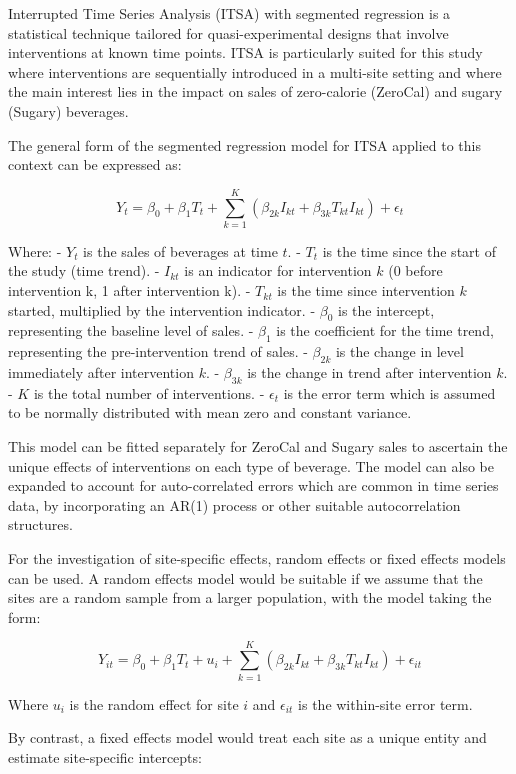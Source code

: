 \documentclass[
]{article}
\begin{document}
Interrupted Time Series Analysis (ITSA) with segmented regression is a
statistical technique tailored for quasi-experimental designs that
involve interventions at known time points. ITSA is particularly suited
for this study where interventions are sequentially introduced in a
multi-site setting and where the main interest lies in the impact on
sales of zero-calorie (ZeroCal) and sugary (Sugary) beverages.

The general form of the segmented regression model for ITSA applied to
this context can be expressed as:

\[Y_t = \beta_0 + \beta_1 T_t + \sum_{k=1}^{K} (\beta_{2k} I_{kt} + \beta_{3k} T_{kt} I_{kt}) + \epsilon_t \]

Where: - \(Y_t\) is the sales of beverages at time \(t\). - \(T_t\) is
the time since the start of the study (time trend). - \(I_{kt}\) is an
indicator for intervention \(k\) (0 before intervention k, 1 after
intervention k). - \(T_{kt}\) is the time since intervention \(k\)
started, multiplied by the intervention indicator. - \(\beta_0\) is the
intercept, representing the baseline level of sales. - \(\beta_1\) is
the coefficient for the time trend, representing the pre-intervention
trend of sales. - \(\beta_{2k}\) is the change in level immediately
after intervention \(k\). - \(\beta_{3k}\) is the change in trend after
intervention \(k\). - \(K\) is the total number of interventions. -
\(\epsilon_t\) is the error term which is assumed to be normally
distributed with mean zero and constant variance.

This model can be fitted separately for ZeroCal and Sugary sales to
ascertain the unique effects of interventions on each type of beverage.
The model can also be expanded to account for auto-correlated errors
which are common in time series data, by incorporating an AR(1) process
or other suitable autocorrelation structures.

For the investigation of site-specific effects, random effects or fixed
effects models can be used. A random effects model would be suitable if
we assume that the sites are a random sample from a larger population,
with the model taking the form:

\[Y_{it} = \beta_0 + \beta_1 T_t + u_i + \sum_{k=1}^{K} (\beta_{2k} I_{kt} + \beta_{3k} T_{kt} I_{kt}) + \epsilon_{it} \]

Where \(u_i\) is the random effect for site \(i\) and \(\epsilon_{it}\)
is the within-site error term.

By contrast, a fixed effects model would treat each site as a unique
entity and estimate site-specific intercepts:
\end{document}
